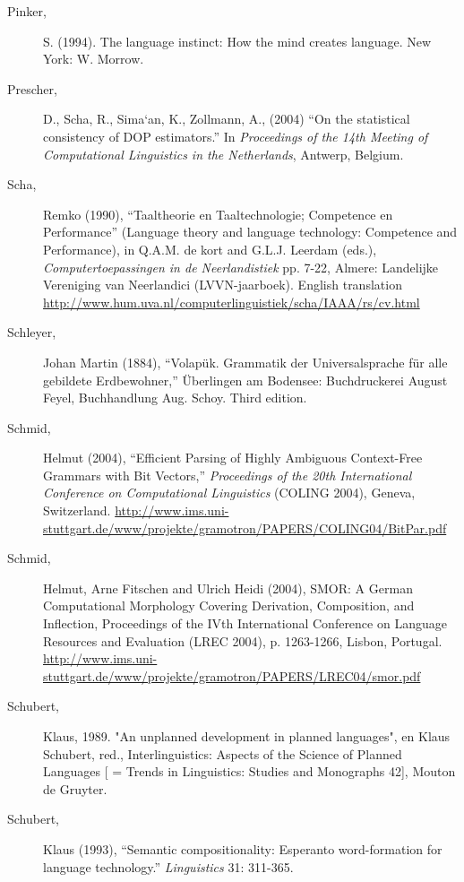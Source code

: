 \documentclass[10pt,a4paper]{article}
\begin{document}
\begin{description}
\item[Pinker,] S. (1994). The language instinct: How the mind creates language. New York: W. Morrow.

\item[Prescher,] D., Scha, R., Sima`an, K., Zollmann, A., (2004) ``On the statistical
consistency of DOP estimators.'' In {\em Proceedings of the 14th Meeting of
Computational Linguistics in the Netherlands}, Antwerp, Belgium.

\item[Scha,] Remko (1990), ``Taaltheorie en Taaltechnologie; Competence en
Performance'' (Language theory and language technology: Competence and
Performance), in Q.A.M. de kort and G.L.J. Leerdam (eds.), {\em
Computertoepassingen in de Neerlandistiek} pp. 7-22, Almere: Landelijke
Vereniging van Neerlandici (LVVN-jaarboek). English translation
\url{http://www.hum.uva.nl/computerlinguistiek/scha/IAAA/rs/cv.html}

\item[Schleyer,] Johan Martin (1884), ``Volap\"uk. Grammatik der Universalsprache f\"ur
alle gebildete Erdbewohner,'' \"Uberlingen am Bodensee: Buchdruckerei August
Feyel, Buchhandlung Aug. Schoy. Third edition.

\item[Schmid,] Helmut (2004), ``Efficient Parsing of Highly Ambiguous Context-Free
Grammars with Bit Vectors,'' {\em Proceedings of the 20th International Conference
on Computational Linguistics} (COLING 2004), Geneva, Switzerland.
\url{http://www.ims.uni-stuttgart.de/www/projekte/gramotron/PAPERS/COLING04/BitPar.pdf}

\item[Schmid,] Helmut, Arne Fitschen and Ulrich Heidi (2004), SMOR: A German
Computational Morphology Covering Derivation, Composition, and Inflection,
Proceedings of the IVth International Conference on Language Resources and
Evaluation (LREC 2004), p. 1263-1266, Lisbon, Portugal.
\url{http://www.ims.uni-stuttgart.de/www/projekte/gramotron/PAPERS/LREC04/smor.pdf}

\item[Schubert,] Klaus, 1989. "An unplanned development in planned languages",
en Klaus Schubert, red., Interlinguistics: Aspects of the Science of Planned
Languages [ = Trends in Linguistics: Studies and Monographs 42], Mouton de
Gruyter.

\item[Schubert,] Klaus (1993), ``Semantic compositionality: Esperanto
word-formation for language technology.'' {\em Linguistics} 31: 311-365.


\end{description}
\end{document}
